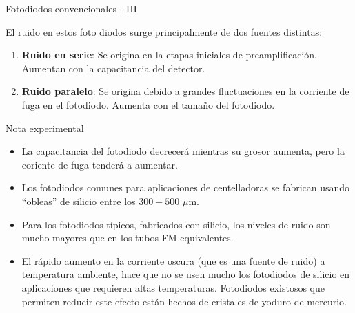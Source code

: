 \documentclass[a4paper,10pt]{beamer}
\begin{document}
\begin{frame}{Fotodiodos convencionales - III}
 
 El ruido en estos foto diodos surge principalmente de dos fuentes distintas:
 
 \begin{enumerate}
  \item \begin{justify}
	  \textbf{Ruido en serie}: Se origina en la etapas iniciales de 
	  preamplificación. Aumentan con la capacitancia del detector.
	\end{justify}
  \item \begin{justify}
         \textbf{Ruido paralelo}: Se origina debido a grandes fluctuaciones en 
         la corriente de fuga en el fotodiodo. Aumenta con el tamaño del fotodiodo.
        \end{justify}
 \end{enumerate}
 
 \begin{exampleblock}{Nota experimental}
  \begin{itemize}[<+->]
   \item \begin{justify}
          La capacitancia del fotodiodo decrecerá mientras su grosor aumenta, pero 
          la coriente de fuga tenderá a aumentar.
         \end{justify}
   \item \begin{justify}
          Los fotodiodos comunes para aplicaciones de centelladoras se fabrican usando 
          ``obleas'' de silicio entre los $300-500$ $\mu$m.
         \end{justify}
   \item \begin{justify}
          Para los fotodiodos típicos, fabricados con silicio, los niveles de ruido 
          son mucho mayores que en los tubos FM equivalentes.
         \end{justify}      
   \item \begin{justify}
          El rápido aumento en la corriente oscura (que es una fuente de ruido) 
          a temperatura ambiente, hace que no se usen mucho los fotodiodos de silicio
          en aplicaciones que requieren altas temperaturas. Fotodiodos existosos 
          que permiten reducir este efecto están hechos de cristales de yoduro de 
          mercurio.
         \end{justify}
  \end{itemize}

 \end{exampleblock}

\end{frame}
\end{document}
